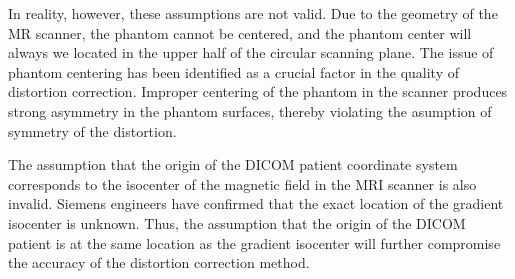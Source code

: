 
In reality, however, these assumptions are not valid. Due to the geometry of the MR scanner, 
the phantom cannot be centered, and the phantom center will always we located in the upper half of the 
circular scanning plane. The issue of phantom centering has been identified as a crucial factor in the 
quality of distortion correction. Improper centering of the phantom in the scanner produces strong asymmetry 
in the phantom surfaces, thereby violating the asumption of symmetry of the distortion.


The assumption that the origin of the DICOM patient coordinate system corresponds to the isocenter of the magnetic field in the MRI scanner is also invalid. Siemens engineers have confirmed that the exact location of the gradient isocenter is unknown. Thus, the assumption that the origin of the DICOM patient is at the same location as the gradient isocenter will further compromise the accuracy of the distortion correction method.


